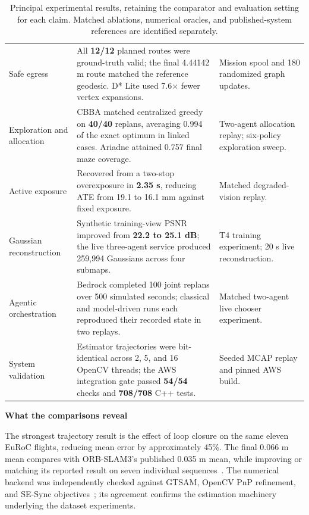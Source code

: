 \documentclass[10pt,a4paper]{article}
\newcommand{\indentedheading}[1]{\par\addvspace{0.65em}\noindent\hspace*{1em}\textbf{#1}\par\smallskip}
\begin{document}
\begin{table}[t]
\begin{tabular}{@{}P{2.4cm}P{9.65cm}P{3.75cm}@{}}
Safe egress &
All \textbf{12/12} planned routes were ground-truth valid;
the final 4.44142 m route matched the reference geodesic.
D* Lite used 7.6$\times$ fewer vertex expansions.
&
Mission spool and 180 randomized graph updates.
\\

Exploration and allocation &
CBBA matched centralized greedy on
\textbf{40/40} replans, averaging 0.994 of the
exact optimum in linked cases. Ariadne attained
0.757 final maze coverage.
&
Two-agent allocation replay; six-policy exploration sweep.
\\

Active exposure &
Recovered from a two-stop overexposure in
\textbf{2.35 s}, reducing ATE from 19.1 to
16.1 mm against fixed exposure.
&
Matched degraded-vision replay.
\\

Gaussian reconstruction &
Synthetic training-view PSNR improved from
\textbf{22.2 to 25.1 dB}; the live three-agent
service produced 259,994 Gaussians across four submaps.
&
T4 training experiment; 20 s live reconstruction.
\\

Agentic orchestration &
Bedrock completed 100 joint replans over
500 simulated seconds; classical and model-driven
runs each reproduced their recorded state in two replays.
&
Matched two-agent live chooser experiment.
\\

System validation &
Estimator trajectories were bit-identical across
2, 5, and 16 OpenCV threads; the AWS integration
gate passed \textbf{54/54} checks and
\textbf{708/708} C++ tests.
&
Seeded MCAP replay and pinned AWS build.
\\

\bottomrule
\end{tabular}
\caption{Principal experimental results, retaining the comparator and
evaluation setting for each claim. Matched ablations, numerical oracles,
and published-system references are identified separately.}
\label{tab:wins}
\end{table}

\indentedheading{What the comparisons reveal}

The strongest trajectory result is the effect of loop closure on
the same eleven EuRoC flights, reducing mean error by approximately
45\%. The final 0.066 m mean compares with ORB-SLAM3's published
0.035 m mean, while improving or matching its reported result on
seven individual sequences~\cite{orbslam3}. The numerical backend
was independently checked against GTSAM, OpenCV PnP refinement,
and SE-Sync objectives~\cite{sesync}; its agreement confirms the
estimation machinery underlying the dataset experiments.
\end{document}
